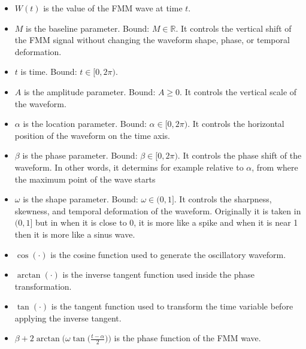 \documentclass[a4paper]{article}
\begin{document}
    \begin{itemize}
        \item $W(t)$ is the value of the FMM wave at time $t$.
        \item $M$ is the baseline parameter. Bound: $M \in \mathbb{R}$. It controls the vertical shift of the FMM signal without changing the waveform shape, phase, or temporal deformation.
        
        \item $t$ is time. Bound: $t \in [0, 2\pi)$.
        
        \item $A$ is the amplitude parameter. Bound: $A \geq 0$. It controls the vertical scale of the waveform.
        
        \item $\alpha$ is the location parameter. Bound: $\alpha \in [0, 2\pi)$. It controls the horizontal position of the waveform on the time axis.
        
        \item $\beta$ is the phase parameter. Bound: $\beta \in [0, 2\pi)$. It controls the phase shift of the waveform. In other words, it determins for example relative to $\alpha$, from where the maximum point of the wave starts
        
        \item $\omega$ is the shape parameter. Bound: $\omega \in (0, 1]$. It controls the sharpness, skewness, and temporal deformation of the waveform. Originally it is taken in $(0, 1]$ but in \cite{rueda-2021-a-novel-wave-decomposition-for-oscillatory-signals} when it is close to 0, it is more like a spike and when it is near 1 then it is more like a sinus wave.
        
        \item $\cos(\cdot)$ is the cosine function used to generate the oscillatory waveform.
        
        \item $\arctan(\cdot)$ is the inverse tangent function used inside the phase transformation.
        
        \item $\tan(\cdot)$ is the tangent function used to transform the time variable before applying the inverse tangent.
        
        \item $\beta + 2 \arctan\bigl(\omega \tan\bigl(\frac{t-\alpha}{2}\bigr)\bigr)$ is the phase function of the FMM wave.
    \end{itemize}
    
\end{document}
